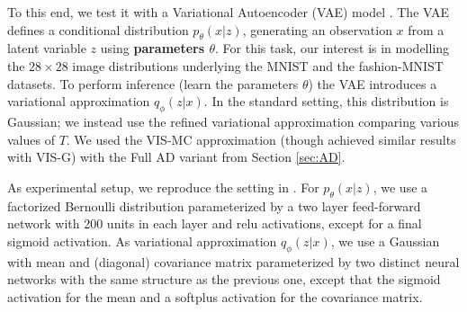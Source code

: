  To this end, we test it with a Variational Autoencoder (VAE) model \cite{kingma2013auto}. %
The VAE defines a conditional distribution $p_{\theta}(x | z)$, generating an observation $x$ from a latent variable $z$ using {\bf parameters $\theta$}. For this task, our interest 
is in modelling the $28 \times 28$ image distributions 
underlying the MNIST \cite{lecun-mnisthandwrittendigit-2010} and the fashion-MNIST \cite{xiao2017/online} datasets. To perform inference (learn
the parameters $\theta$) the VAE introduces a variational approximation $q_{\phi}(z | x)$. In the standard setting, this distribution is Gaussian; we instead use the refined variational approximation comparing various values of $T$. We used the VIS-MC approximation (though achieved similar results
with VIS-G) with the Full AD variant from Section \ref{sec:AD}.

As experimental setup, we reproduce the setting in \cite{pmlr-v89-titsias19a}. For $p_{\theta}(x | z)$, we use a factorized Bernoulli distribution parameterized by a two layer feed-forward network with 200 units in each layer and relu activations, except for a final sigmoid activation. As variational approximation $q_{\phi}(z | x)$, we use a Gaussian with mean and (diagonal) covariance matrix parameterized by
two distinct neural networks with the same structure as the previous one, except that the sigmoid activation for the mean and a softplus activation for the covariance matrix.



